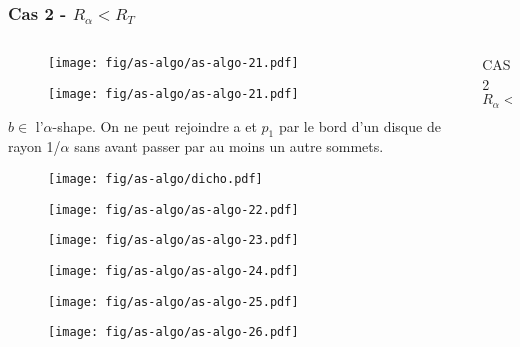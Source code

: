 \begin{frame}
  \frametitle{Cas 2 - $R_{\alpha} < R_T$}
 \begin{columns}[t]
   \begin{column}{7cm}
      {
        \begin{figure}[h!]
          \centering
          \texttt{[image: fig/as-algo/as-algo-21.pdf]}
      \end{figure}
      }
      {
        \begin{figure}[h!]
          \centering
          \texttt{[image: fig/as-algo/as-algo-21.pdf]}
      \end{figure}
      }
      {
      	\begin{block}{$b \in$ l'$\alpha$-shape.}
          On ne peut rejoindre a et $p_1$ par le bord d'un disque de rayon 1/$\alpha$ sans avant passer par au moins un autre sommets.
          \end{block}
      }         
      {
        \begin{figure}[h!]
          \centering
          \texttt{[image: fig/as-algo/dicho.pdf]}
      \end{figure}
      }
      
      {
        \begin{figure}[h!]
          \centering
          \texttt{[image: fig/as-algo/as-algo-22.pdf]}
      \end{figure}
      }
      {
        \begin{figure}[h!]
          \centering
          \texttt{[image: fig/as-algo/as-algo-23.pdf]}
      \end{figure}
      }
      {
        \begin{figure}[h!]
          \centering
          \texttt{[image: fig/as-algo/as-algo-24.pdf]}
      \end{figure}
      }
      {
        \begin{figure}[h!]
          \centering
          \texttt{[image: fig/as-algo/as-algo-25.pdf]}
      \end{figure}
      }
      {
        \begin{figure}[h!]
          \centering
          \texttt{[image: fig/as-algo/as-algo-26.pdf]}
      \end{figure}
      }
    \end{column}
    \begin{column}{3cm}
      \begin{block}{}
        {
          \alert{CAS 2}\\
          \alert{$R_{\alpha} < R_T$}

}
\end{block}
\end{column}
\end{columns}
\end{frame}
